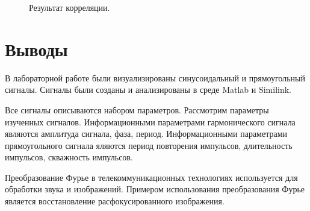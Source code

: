 \documentclass[12pt,a4paper]{scrartcl}
\begin{document}
\begin{figure}[h!]
	\caption{Результат корреляции.}
\end{figure}

\newpage
\section{Выводы}
В лабораторной работе были визуализированы синусоидальный и прямоугольный сигналы. Сигналы были созданы и анализированы в среде Matlab и Similink.

Все сигналы описываются набором параметров. Рассмотрим параметры изученных сигналов. Информационными параметрами гармонического сигнала являются амплитуда сигнала, фаза, период. Информационными параметрами прямоугольного сигнала яляются период повторения импульсов, длительность импульсов, скважность импульсов.

 Преобразование Фурье в телекоммуникационных технологиях используется для обработки звука и изображений. Примером использования преобразования Фурье является восстановление расфокусированного изображения. 
\end{document}
